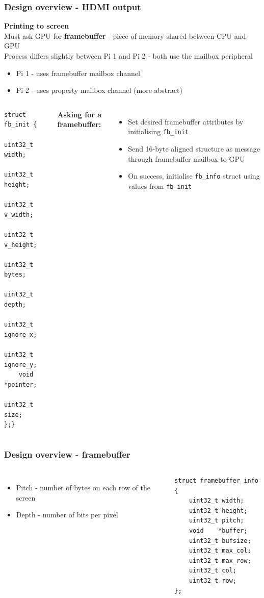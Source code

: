 \documentclass[10pt]{beamer}
\newcommand{\code}[1]{\texttt{#1}}
\begin{document}
\begin{frame}[fragile]
    \frametitle{Design overview - HDMI output}

    \textbf{Printing to screen} \\
    Must ask GPU for \textbf{framebuffer} - piece of memory shared between CPU and GPU \\
    Process differs slightly between Pi 1 and Pi 2 - both use the mailbox peripheral
    \begin{itemize}
        \item Pi 1 - uses framebuffer mailbox channel
        \item Pi 2 - uses property mailbox channel (more abstract)
    \end{itemize}

    \begin{columns}
        \lstset{language=C,basicstyle=\ttfamily}
        \begin{lstlisting}
struct fb_init {
    uint32_t width;
    uint32_t height;
    uint32_t v_width;
    uint32_t v_height;
    uint32_t bytes;
    uint32_t depth;
    uint32_t ignore_x;
    uint32_t ignore_y;
    void    *pointer;
    uint32_t size;
};}
        \end{lstlisting}

        \textbf{Asking for a framebuffer:}
        \begin{itemize}
            \item Set desired framebuffer attributes by initialising \code{fb\_init}
            \item Send 16-byte aligned structure as message through framebuffer mailbox to GPU
            \item On success, initialise \code{fb\_info} struct using values from \code{fb\_init}
        \end{itemize}
    \end{columns}
\end{frame}

\begin{frame}[fragile]
    \frametitle{Design overview - framebuffer}
    \begin{columns}
        \begin{itemize}
            \item Pitch - number of bytes on each row of the screen
            \item Depth - number of bits per pixel
        \end{itemize}

        \lstset{language=C,basicstyle=\ttfamily}
        \begin{lstlisting}
struct framebuffer_info {
    uint32_t width;
    uint32_t height;
    uint32_t pitch;
    void    *buffer;
    uint32_t bufsize;
    uint32_t max_col;
    uint32_t max_row;
    uint32_t col;
    uint32_t row;
};
        \end{lstlisting}
    \end{columns}

\end{frame}
\end{document}
